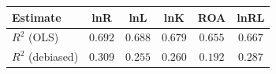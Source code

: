 \begin{tabular}{l*{5}{c}}
\hline\hline
 Estimate & lnR & lnL & lnK & ROA & lnRL \\
\hline
\addlinespace $ R^2$ (OLS) & $0.692$ & $0.688$ & $0.679$ & $0.655$ & $0.667$ \\
$ R^2$ (debiased) & $0.309$ & $0.255$ & $0.260$ & $0.192$ & $0.287$ \\
\hline\hline
\end{tabular}
